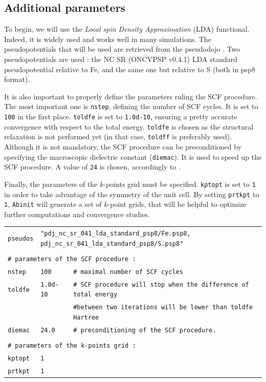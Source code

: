 \documentclass[11pt,a4paper]{article}
\begin{document}
\subsection{Additional parameters}
To begin, we will use the \textit{Local spin Density Approximation} (LDA) functional. Indeed, it is widely used and works well in many simulations. The pseudopotentials that will be used are retrieved from the pseudodojo \cite{PseudoDojo}. Two pseudopotentials are used : the NC SR (ONCVPSP v0.4.1) LDA standard pseudopotential relative to Fe, and the same one but relative to S (both in psp8 format).

It is also important to properly define the parameters ruling the SCF procedure. The most important one is \texttt{nstep}, defining the number of SCF cycles. It is set to \texttt{100} in the first place. \texttt{toldfe} is set to \texttt{1.0d-10}, ensuring a pretty accurate convergence with respect to the total energy. \texttt{toldfe} is chosen as the structural relaxation is not performed yet (in that case, \texttt{toldff} is preferably used). Although it is not mandatory, the SCF procedure can be preconditioned by specifying the macroscopic dielectric constant (\texttt{diemac}). It is used to speed up the SCF procedure. A value of \texttt{24} is chosen, accordingly to \cite{MaterialsProject}. 

Finally, the parameters of the $k$-points grid must be specified. \texttt{kptopt} is set to \texttt{1} in order to take advantage of the symmetry of the unit cell. 
By setting \texttt{prtkpt} to \texttt{1}, \texttt{Abinit} will generate a set of $k$-point grids, that will be helpful to optimize further computations and convergence studies.
\begin{center}
\begin{tabular}{lll}
\texttt{pseudos} & \multicolumn{2}{l}{\texttt{"pdj\_nc\_sr\_041\_lda\_standard\_psp8/Fe.psp8, pdj\_nc\_sr\_041\_lda\_standard\_psp8/S.psp8"}}\\
&&\\
\multicolumn{3}{l}{\texttt{\# parameters of the SCF procedure : }}\\
\texttt{nstep} & \texttt{100} &\texttt{\# maximal number of SCF cycles}\\
\texttt{toldfe} & \texttt{1.0d-10} &\texttt{\# SCF procedure will stop when the difference of total energy}\\
&&\texttt{\#\space\space\space\space between two iterations will be lower than toldfe Hartree}\\
\texttt{diemac} &\texttt{24.0} & \texttt{\# preconditioning of the SCF procedure.}\\
&&\\
\multicolumn{3}{l}{\texttt{\# parameters of the k-points grid : }}\\
\texttt{kptopt} & \texttt{1} &\\
\texttt{prtkpt} & \texttt{1} 
\end{tabular}
\end{center}
\end{document}
